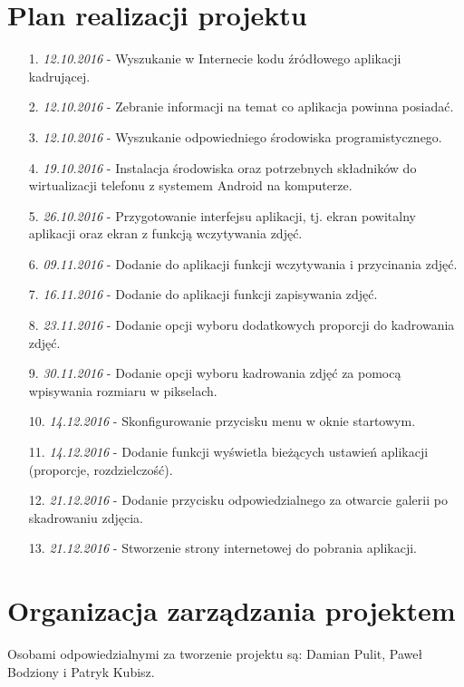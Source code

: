 \section{Plan realizacji projektu}
\begin{itemize} \itemsep1pt \parskip0pt 
\item [1.] \textit{12.10.2016} - Wyszukanie w Internecie kodu źródłowego aplikacji kadrującej.
\item [2.] \textit{12.10.2016} - Zebranie informacji na temat co aplikacja powinna posiadać.
\item [3.] \textit{12.10.2016} - Wyszukanie odpowiedniego środowiska programistycznego.
\item [4.] \textit{19.10.2016} - Instalacja środowiska oraz potrzebnych składników do wirtualizacji telefonu z systemem Android na komputerze. 
\item [5.] \textit{26.10.2016} - Przygotowanie interfejsu aplikacji, tj. ekran powitalny aplikacji oraz ekran z funkcją wczytywania zdjęć.
\item [6.] \textit{09.11.2016} - Dodanie do aplikacji funkcji wczytywania i przycinania zdjęć.
\item [7.] \textit{16.11.2016} - Dodanie do aplikacji funkcji zapisywania zdjęć.
\item [8.] \textit{23.11.2016} - Dodanie opcji wyboru dodatkowych proporcji do kadrowania zdjęć.
\item [9.] \textit{30.11.2016} - Dodanie opcji wyboru kadrowania zdjęć za pomocą wpisywania rozmiaru w pikselach.
\item [10.] \textit{14.12.2016} - Skonfigurowanie przycisku menu w oknie startowym.
\item [11.] \textit{14.12.2016} - Dodanie funkcji wyświetla bieżących ustawień aplikacji (proporcje, rozdzielczość).
\item [12.] \textit{21.12.2016} - Dodanie przycisku odpowiedzialnego za otwarcie galerii po skadrowaniu zdjęcia. 
\item [13.] \textit{21.12.2016} - Stworzenie strony internetowej do pobrania aplikacji. 
\end{itemize}

\section{Organizacja zarządzania projektem}
Osobami odpowiedzialnymi za tworzenie projektu są: Damian Pulit, Paweł \\ Bodziony i Patryk Kubisz. 

